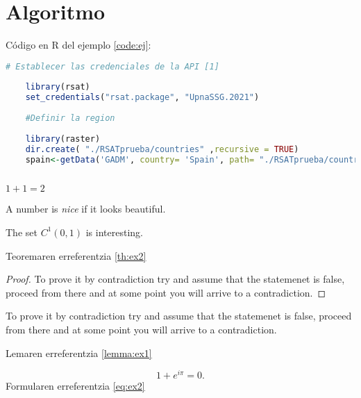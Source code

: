 \chapter[Algoritmo]{Algoritmo}
\label{Chap3}

Código en R del ejemplo \ref{code:ej}:
\begin{lstlisting}[language=R, caption=pie de código,label=code:ej]
	# Establecer las credenciales de la API [1]
	
	library(rsat)
	set_credentials("rsat.package", "UpnaSSG.2021")
	
	#Definir la region
	
	library(raster)
	dir.create( "./RSATprueba/countries" ,recursive = TRUE)
	spain<-getData('GADM', country= 'Spain', path= "./RSATprueba/countries", level=2)
	
\end{lstlisting}


\begin{theorem}[Sum]\label{th:ex1}
	$1+1=2$
\end{theorem}

\begin{definition}\label{def:ex1}
	A number is \emph{nice} if it looks beautiful.
\end{definition}

\begin{theorem}[About $C^{1}(0,1)$]\label{th:ex2}
	The set $C^{1}(0,1)$ is interesting.
\end{theorem}
Teoremaren erreferentzia \ref{th:ex2}

\begin{proof}\label{pf:ex1}
	To prove it by contradiction try and assume that the statemenet is false,
	proceed from there and at some point you will arrive to a contradiction.
\end{proof}



\begin{lemma}\label{lemma:ex1}
	To prove it by contradiction try and assume that the statemenet is false,
	proceed from there and at some point you will arrive to a contradiction.
\end{lemma}

Lemaren erreferentzia \ref{lemma:ex1}


\begin{equation}\label{eq:ex2}
	1 + e^{i \pi} = 0.
\end{equation}
Formularen erreferentzia \ref{eq:ex2}

